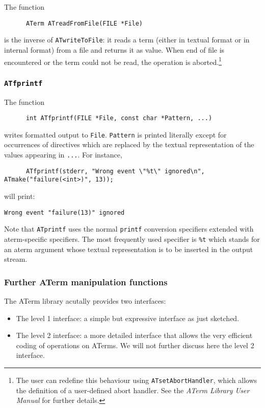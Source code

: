 \documentclass[twoside]{article} %
\begin{document}
The function
\begin{verbatim}
      ATerm ATreadFromFile(FILE *File)
\end{verbatim}
is the inverse of {\tt ATwriteToFile}: it reads a term (either in textual format or in internal format)
from a file and returns it as value. When end of file is encountered
or the term could not be read, the operation is aborted.\footnote{The user can redefine this behaviour
using {\tt ATsetAbortHandler}, which allows the definition of a user-defined abort handler.
See the \emph{ATerm Library User Manual} for further details.}

\subsubsection{\label{ATprintf}{\tt ATfprintf}}
The function
\begin{verbatim}
      int ATfprintf(FILE *File, const char *Pattern, ...)
\end{verbatim}
writes formatted output to {\tt File}.
{\tt Pattern} is printed literally except for occurrences
of directives which are replaced by the textual representation
of the values appearing in {\tt ...}. For instance,
\begin{verbatim}
      ATfprintf(stderr, "Wrong event \"%t\" ignored\n", ATmake("failure(<int>)", 13));
\end{verbatim}
will print:
\begin{verbatim}
Wrong event "failure(13)" ignored
\end{verbatim}

Note that {\tt ATprintf} uses the normal {\tt printf} conversion
specifiers extended with aterm-specific specifiers. The most
frequently used specifier is {\tt \%t} which stands for an aterm
argument whose textual representation is to be inserted in the output
stream.


\subsubsection{\label{ATermManipulation}Further ATerm manipulation functions}

The ATerm library acutally provides two interfaces:

\begin{itemize}

\item The level 1 interface: a simple but expressive interface as just sketched.

\item The level 2 interface: a more detailed interface that allows the
very efficient coding of operations on ATerms. We will not further
discuss here the level 2 interface.

\end{itemize}
\end{document}
